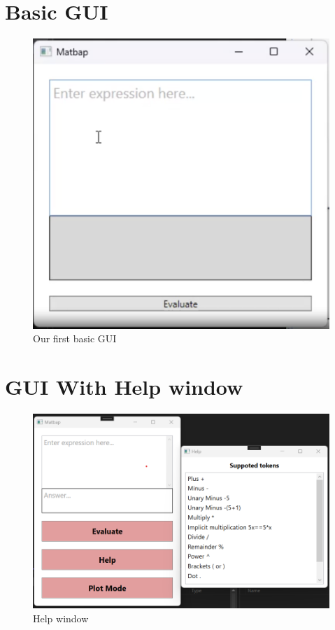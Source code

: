 \documentclass[a4paper, oneside, 11pt]{report}
\begin{document}
\section{Basic GUI}
\begin{figure}[H]
\begin{center}
\includegraphics[scale=0.5]{Basic GUI.png}
\caption{Our first basic GUI}
\label{basicgui}
\end{center}
\end{figure}

\section{GUI With Help window}
\begin{figure}[H]
\begin{center}
\includegraphics[scale=0.5]{FirstGUIWithHelp.png}
\caption{Help window}
\label{basicgui}
\end{center}
\end{figure}
\end{document}
